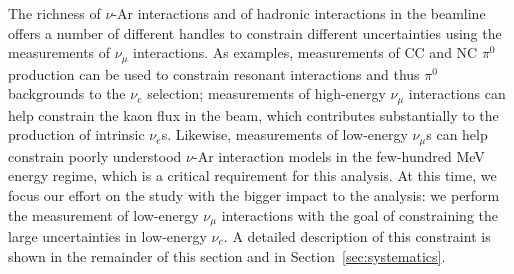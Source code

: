 \par The richness of $\nu$-Ar interactions and of hadronic interactions in the beamline offers a number of different handles 
to constrain different uncertainties using the measurements of $\nu_{\mu}$ interactions.
As examples, measurements of CC and NC $\pi^0$ production can be used to constrain resonant interactions and thus $\pi^0$ backgrounds to the $\nu_e$ selection;  measurements of high-energy $\nu_{\mu}$ interactions can help constrain the kaon flux in the beam, which contributes substantially to the production of intrinsic $\nu_e$s. Likewise, measurements of low-energy $\nu_{\mu}$s can help constrain poorly understood $\nu$-Ar interaction models in the few-hundred MeV energy regime, which is a critical requirement for this analysis.  At this time, we focus our effort on the study with the bigger impact to the analysis: we perform the measurement of low-energy $\nu_{\mu}$ interactions with the goal of constraining the large uncertainties in low-energy $\nu_e$. A detailed  description of this constraint is shown in the remainder of this section and in Section~\ref{sec:systematics}.
